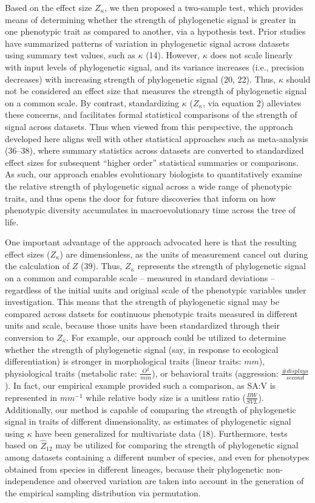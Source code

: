 \documentclass[9pt,twocolumn,twoside,lineno]{pnas-new}
\begin{document}
Based on the effect size \(Z_\kappa\), we then proposed a two-sample
test, which provides means of determining whether the strength of
phylogenetic signal is greater in one phenotypic trait as compared to
another, via a hypothesis test. Prior studies have summarized patterns
of variation in phylogenetic signal across datasets using summary test
values, such as \(\kappa\) (14). However, \(\kappa\) does not scale
linearly with input levels of phylogenetic signal, and its variance
increases (i.e., precision decreases) with increasing strength of
phylogenetic signal (20, 22). Thus, \(\kappa\) should not be considered
an effect size that measures the strength of phylogenetic signal on a
common scale. By contrast, standardizing \(\kappa\) (\(Z_\kappa\), via
equation 2) alleviates these concerns, and facilitates formal
statistical comparisons of the strength of signal across datasets. Thus
when viewed from this perspective, the approach developed here aligns
well with other statistical approaches such as meta-analysis (36--38),
where summary statistics across datasets are converted to standardized
effect sizes for subsequent ``higher order'' statistical summaries or
comparisons. As such, our approach enables evolutionary biologists to
quantitatively examine the relative strength of phylogenetic signal
across a wide range of phenotypic traits, and thus opens the door for
future discoveries that inform on how phenotypic diversity accumulates
in macroevolutionary time across the tree of life.

One important advantage of the approach advocated here is that the
resulting effect sizes (\(Z_\kappa\)) are dimensionless, as the units of
measurement cancel out during the calculation of \(Z\) (39). Thus,
\(Z_\kappa\) represents the strength of phylogenetic signal on a common
and comparable scale -- measured in standard deviations -- regardless of
the initial units and original scale of the phenotypic variables under
investigation. This means that the strength of phylogenetic signal may
be compared across datsets for continuous phenotypic traits measured in
different units and scale, because those units have been standardized
through their conversion to \(Z_\kappa\). For example, our approach
could be utilized to determine whether the strength of phylogenetic
signal (say, in response to ecological differentiation) is stronger in
morphological traits (linear traits: \(mm\)), physiological traits
(metabolic rate: \(\frac{O^2}{min}\)), or behavioral traits (aggression:
\(\frac{\#{displays}}{second}\)). In fact, our empirical example
provided such a comparison, as SA:V is represented in \(mm^{-1}\) while
relative body size is a unitless ratio (\(\frac{BW}{SVL}\)).
Additionally, our method is capable of comparing the strength of
phylogenetic signal in traits of different dimensionality, as estimates
of phylogenetic signal using \(\kappa\) have been generalized for
multivariate data (18). Furthermore, tests based on \(\hat{Z}_{12}\) may
be utilized for comparing the strength of phylogenetic signal among
datasets containing a different number of species, and even for
phenotypes obtained from species in different lineages, because their
phylogenetic non-independence and observed variation are taken into
account in the generation of the empirical sampling distribution via
permutation.
\end{document}
